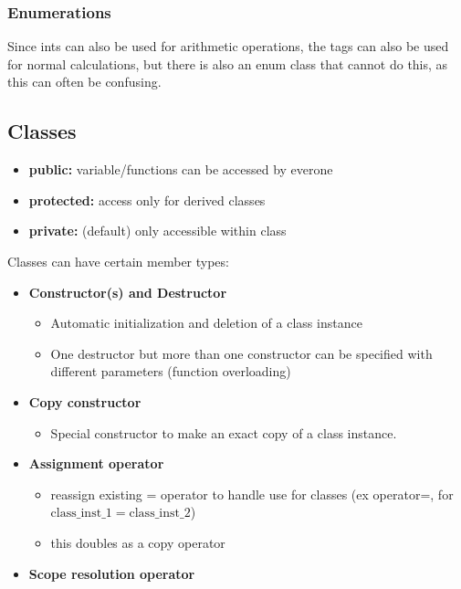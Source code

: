\subsubsection{Enumerations}


%

Since ints can also be used for arithmetic operations, the tags can also be used for normal calculations, but there is also an enum class that cannot do this, as this can often be confusing.

\subsection{Classes}


\begin{itemize}
    \item \textbf{public:} variable/functions can be accessed by everone
    \item \textbf{protected:} access only for derived classes
    \item \textbf{private:} (default) only accessible within class
\end{itemize}

Classes can have certain member types:

\begin{itemize}
    \item \textbf{Constructor(s) and Destructor}
    \begin{itemize}
        \item Automatic initialization and deletion of a class instance
        \item One destructor but more than one constructor can be specified with different parameters (function overloading)
    \end{itemize}
    \item \textbf{Copy constructor}
    \begin{itemize}
        \item Special constructor to make an exact copy of a class instance.
    \end{itemize}
    \item \textbf{Assignment operator}
    \begin{itemize}
        \item reassign existing = operator to handle use for classes (ex operator=, for $\mathrm{class\_inst\_1 = class\_inst\_2}$)
        \item this doubles as a copy operator
    \end{itemize}
    \item \textbf{Scope resolution operator}
\end{itemize}

